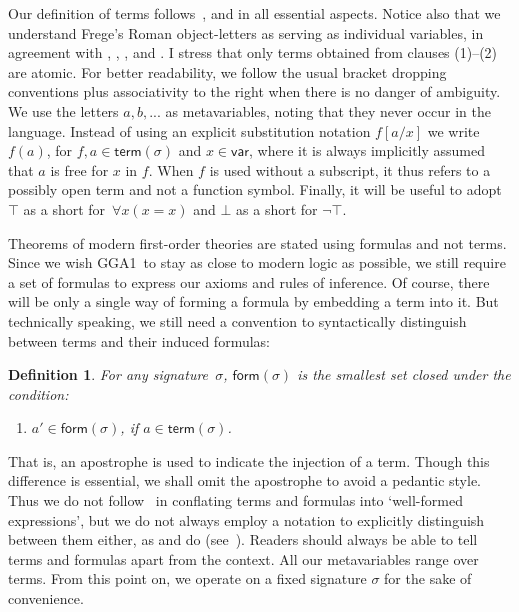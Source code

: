 \documentclass{preprint}
\newtheorem{definition}[theorem]{Definition}
\newcommand{\var}{\mathsf{var}}
\newcommand{\term}{\mathsf{term}}
\newcommand{\form}{\mathsf{form}}
\newcommand{\GGA}{\textsf{GGA1}}
\begin{document}
Our definition of terms follows~\citet[p.~46]{klement2002frege}, \citet[\S2.6]{landini2012frege} and \citet[\S\S3.2--3.3, 4.3]{cadetpanza2015logical} in all essential aspects. Notice also that we understand Frege's Roman object-letters as serving as individual variables, in agreement with \citet[\S1]{kemp1998propositions}, \citet[p.~38]{klement2002frege}, \citet[\S3]{heck2007frege}, and \citet[p.~32, \S5.1]{landini2012frege}. 
I stress that only terms obtained from clauses (1)--(2) are atomic. For better readability, we follow the usual bracket dropping conventions plus associativity to the right when there is no danger of ambiguity. 
We use the letters $a, b, ...$ as metavariables, noting that they never occur in the language. Instead of using an explicit substitution notation $f[a/x]$ we write $f(a)$, for $f, a \in \term(\sigma)$ and $x \in \var$, where it is always implicitly assumed that $a$ is free for $x$ in $f$. When $f$ is used without a subscript, it thus refers to a possibly open term and not a function symbol. 
Finally, it will be useful to adopt $\top$ as a short for~$\forall x (x=x)$ and $\bot$ as a short for $\neg \top$.  



Theorems of modern first-order theories are stated using formulas and not terms. 
Since we wish \GGA~to stay as close to modern logic as possible, we still require a set of formulas to express our axioms and rules of inference. 
Of course, there will be only a single way of forming a formula by embedding a term into it. 
But technically speaking, we still need a convention to syntactically distinguish between terms and their induced formulas: 

\begin{definition}
	For any signature~$\sigma$, $\form(\sigma)$ is the smallest set closed under the condition:
	\begin{enumerate}
		\item $a' \in \form(\sigma)$, if $a \in \term(\sigma)$.
	\end{enumerate}
\end{definition}


That is, an apostrophe is used to indicate the injection of a term. 
Though this difference is essential, we shall omit the apostrophe to avoid a pedantic style.  Thus we do not follow~\cite{klement2002frege} in conflating terms and formulas into `well-formed expressions', but we do not always employ a notation to explicitly distinguish between them either, as \cite{landini2012frege} and \cite{cadetpanza2015logical} do (see~). Readers should always be able to tell terms and formulas apart from the context. All our metavariables range over terms. 
From this point on, we operate on a fixed signature $\sigma$ for the sake of convenience. 
\end{document}
